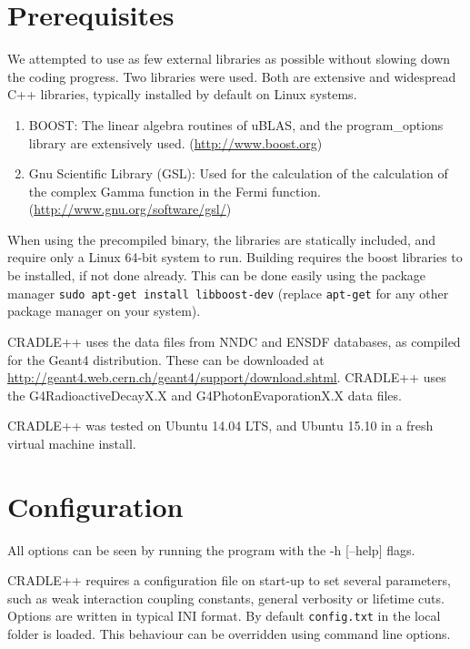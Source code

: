 \documentclass[11pt,a4paper]{article}
\theoremstyle{plain}
\theoremstyle{definition}
\theoremstyle{remark}
\begin{document}
\section{Prerequisites}
We attempted to use as few external libraries as possible without slowing down the coding progress. Two libraries were used. Both are extensive and widespread C++ libraries, typically installed by default on Linux systems.
\begin{enumerate}
\item BOOST: The linear algebra routines of uBLAS, and the program\_options library are extensively used. (\url{http://www.boost.org})
\item Gnu Scientific Library (GSL): Used for the calculation of the calculation of the complex Gamma function in the Fermi function. (\url{http://www.gnu.org/software/gsl/})
\end{enumerate}
 When using the precompiled binary, the libraries are statically included, and require only a Linux 64-bit system to run. Building requires the boost libraries to be installed, if not done already. This can be done easily using the package manager {\tt sudo apt-get install libboost-dev} (replace {\tt apt-get} for any other package manager on your system).
\vspace{10pt}

CRADLE++ uses the data files from NNDC and ENSDF databases, as compiled for the Geant4 distribution. These can be downloaded at \url{http://geant4.web.cern.ch/geant4/support/download.shtml}. CRADLE++ uses the G4RadioactiveDecayX.X and G4PhotonEvaporationX.X data files.
\vspace{10pt}

CRADLE++ was tested on Ubuntu 14.04 LTS, and Ubuntu 15.10 in a fresh virtual machine install.

\section{Configuration}
All options can be seen by running the program with the -h [--help] flags.
\vspace{10pt}

CRADLE++ requires a configuration file on start-up to set several parameters, such as weak interaction coupling constants, general verbosity or lifetime cuts. Options are written in typical INI format. By default {\tt config.txt} in the local folder is loaded. This behaviour can be overridden using command line options.
\vspace{10pt}
\end{document}

